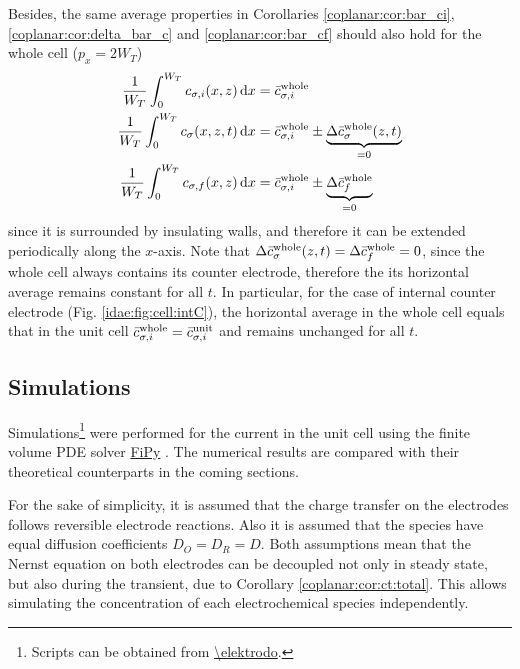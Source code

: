 Besides, the same average properties
in Corollaries \ref{coplanar:cor:bar_ci}, \ref{coplanar:cor:delta_bar_c} and \ref{coplanar:cor:bar_cf}
should also hold for the whole cell ($p_{x} = 2W_{T}$)
\begin{subequations}
	\label{idae:eqn:bar_c:whole}
	\begin{align}
		\label{idae:eqn:bar_ci:whole}
		\frac{1}{W_{T}} \int_{0}^{W_{T}} c_{\sigma,i}(x,z) \,\mathrm{d}x
		&= \bar{c}_{\sigma,i}^{\text{whole}}
		\\
		\label{idae:eqn:bar_ct:whole}
		\frac{1}{W_{T}} \int_{0}^{W_{T}} c_{\sigma}(x,z,t) \,\mathrm{d}x
		&= \bar{c}_{\sigma,i}^{\text{whole}} 
		\pm \underbrace{\Delta\bar{c}_{\sigma}^{\text{whole}}(z,t)}_{=0}
		\\
		\label{idae:eqn:bar_cf:whole}
		\frac{1}{W_{T}} \int_{0}^{W_{T}} c_{\sigma,f}(x,z) \,\mathrm{d}x
		&= \bar{c}_{\sigma,i}^{\text{whole}} 
		\pm \underbrace{\Delta\bar{c}_{f}^{\text{whole}}}_{=0}
	\end{align}
\end{subequations}
since it is surrounded by insulating walls,
and therefore it can be extended periodically along the $x$-axis.
Note that $\Delta\bar{c}_{\sigma}^{\text{whole}}(z,t) = \Delta\bar{c}_{f}^{\text{whole}} = 0$,
since the whole cell always contains its counter electrode,
therefore the its horizontal average remains constant for all $t$.
In particular, for the case of internal counter electrode (Fig. \ref{idae:fig:cell:intC}),
the horizontal average in the whole cell equals that in the unit cell
$\bar{c}_{\sigma,i}^{\text{whole}} = \bar{c}_{\sigma,i}^{\text{unit}}$
and remains unchanged for all $t$.

\subsection{Simulations}

Simulations\footnote{Scripts can be obtained from \url{\elektrodo}.}
were performed for the current in the unit cell using the finite volume PDE solver
\href{http://www.ctcms.nist.gov/fipy/}{FiPy} \cite{Guyer:2009:may}.
The numerical results are compared with their theoretical counterparts in the coming sections.

For the sake of simplicity, it is assumed that
the charge transfer on the electrodes follows reversible electrode reactions.
Also it is assumed that the species have equal diffusion coefficients $D_{O} = D_{R} = D$.
Both assumptions mean that the Nernst equation on both electrodes can be decoupled not only in steady state, but also during the transient, due to Corollary \ref{coplanar:cor:ct:total}.
This allows simulating the concentration of each electrochemical species independently.

